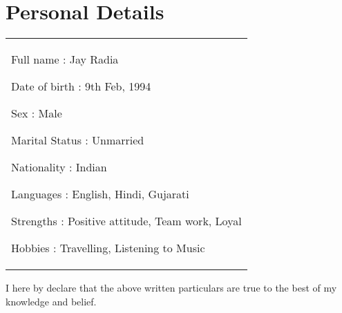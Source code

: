 \documentclass[a4paper,10pt]{extarticle} %
\begin{document}
	\section{\textcolor{primary}{Personal Details}}
	\vspace{-0.2cm}
	\begin{tabular}{p{19.7cm}}
		\begin{description}[style=nextline, font=$\bullet$\hspace{2mm}\normalsize]
			
			\item Full name \hspace{1.5cm}        : Jay Radia
			\item Date of birth \hspace{1cm}    : 9th Feb, 1994
			\item Sex \hspace{2.47cm}              : Male
			\item Marital Status \hspace{0.8cm}   : Unmarried
			\item Nationality \hspace{1.3cm}      : Indian
			\item Languages \hspace{1.35cm}        : English, Hindi, Gujarati
			\item Strengths \hspace{1.45cm}        : Positive attitude, Team work, Loyal
			\item Hobbies \hspace{1.7cm}        : Travelling, Listening to Music
		\end{description}
	\end{tabular}
	
	\begin{description}
		\item I here by declare that the above written particulars are true to the best of my knowledge and
		belief.
	\end{description}
	
\end{document}
